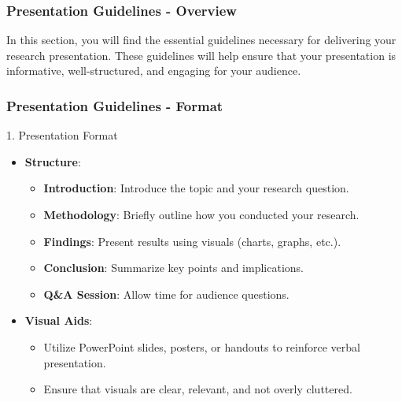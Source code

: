 \documentclass[aspectratio=169]{beamer}
\begin{document}
\begin{frame}[fragile]
    \frametitle{Presentation Guidelines - Overview}
    In this section, you will find the essential guidelines necessary for delivering your research presentation. 
    These guidelines will help ensure that your presentation is informative, well-structured, and engaging for your audience.
\end{frame}

\begin{frame}[fragile]
    \frametitle{Presentation Guidelines - Format}
    \begin{block}{1. Presentation Format}
        \begin{itemize}
            \item \textbf{Structure}:
                \begin{itemize}
                    \item \textbf{Introduction}: Introduce the topic and your research question.
                    \item \textbf{Methodology}: Briefly outline how you conducted your research.
                    \item \textbf{Findings}: Present results using visuals (charts, graphs, etc.).
                    \item \textbf{Conclusion}: Summarize key points and implications.
                    \item \textbf{Q\&A Session}: Allow time for audience questions.
                \end{itemize}
            \item \textbf{Visual Aids}: 
                \begin{itemize}
                    \item Utilize PowerPoint slides, posters, or handouts to reinforce verbal presentation.
                    \item Ensure that visuals are clear, relevant, and not overly cluttered.
                \end{itemize}
        \end{itemize}
    \end{block}
\end{frame}
\end{document}
